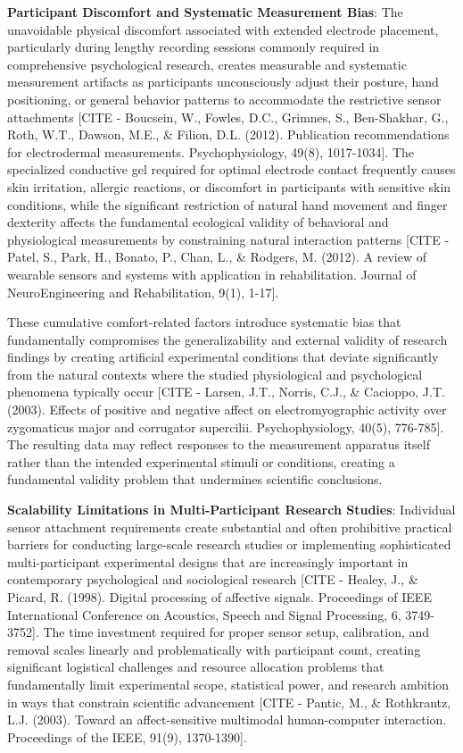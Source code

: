 \documentclass[12pt,a4paper]{report}
\begin{document}
\textbf{Participant Discomfort and Systematic Measurement Bias}: The unavoidable physical discomfort associated with extended
electrode placement, particularly during lengthy recording sessions commonly required in comprehensive psychological
research, creates measurable and systematic measurement artifacts as participants unconsciously adjust their posture,
hand positioning, or general behavior patterns to accommodate the restrictive sensor
attachments [CITE - Boucsein, W., Fowles, D.C., Grimnes, S., Ben-Shakhar, G., Roth, W.T., Dawson, M.E., \& Filion, D.L. (2012). Publication recommendations for electrodermal measurements. Psychophysiology, 49(8), 1017-1034].
The specialized conductive gel required for optimal electrode contact frequently causes skin irritation, allergic
reactions, or discomfort in participants with sensitive skin conditions, while the significant restriction of natural
hand movement and finger dexterity affects the fundamental ecological validity of behavioral and physiological
measurements by constraining natural interaction
patterns [CITE - Patel, S., Park, H., Bonato, P., Chan, L., \& Rodgers, M. (2012). A review of wearable sensors and systems with application in rehabilitation. Journal of NeuroEngineering and Rehabilitation, 9(1), 1-17].

These cumulative comfort-related factors introduce systematic bias that fundamentally compromises the generalizability
and external validity of research findings by creating artificial experimental conditions that deviate significantly
from the natural contexts where the studied physiological and psychological phenomena typically
occur [CITE - Larsen, J.T., Norris, C.J., \& Cacioppo, J.T. (2003). Effects of positive and negative affect on electromyographic activity over zygomaticus major and corrugator supercilii. Psychophysiology, 40(5), 776-785].
The resulting data may reflect responses to the measurement apparatus itself rather than the intended experimental
stimuli or conditions, creating a fundamental validity problem that undermines scientific conclusions.

\textbf{Scalability Limitations in Multi-Participant Research Studies}: Individual sensor attachment requirements create
substantial and often prohibitive practical barriers for conducting large-scale research studies or implementing
sophisticated multi-participant experimental designs that are increasingly important in contemporary psychological and
sociological
research [CITE - Healey, J., \& Picard, R. (1998). Digital processing of affective signals. Proceedings of IEEE International Conference on Acoustics, Speech and Signal Processing, 6, 3749-3752].
The time investment required for proper sensor setup, calibration, and removal scales linearly and problematically with
participant count, creating significant logistical challenges and resource allocation problems that fundamentally limit
experimental scope, statistical power, and research ambition in ways that constrain scientific
advancement [CITE - Pantic, M., \& Rothkrantz, L.J. (2003). Toward an affect-sensitive multimodal human-computer interaction. Proceedings of the IEEE, 91(9), 1370-1390].
\end{document}
